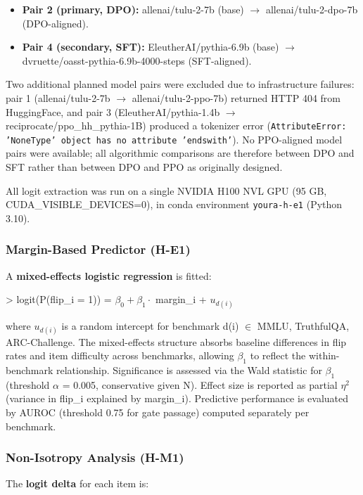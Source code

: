 \begin{itemize}
\item \textbf{Pair 2 (primary, DPO):} allenai/tulu-2-7b (base) $\rightarrow$ allenai/tulu-2-dpo-7b (DPO-aligned).
\item \textbf{Pair 4 (secondary, SFT):} EleutherAI/pythia-6.9b (base) $\rightarrow$ dvruette/oasst-pythia-6.9b-4000-steps (SFT-aligned).
\end{itemize}

Two additional planned model pairs were excluded due to infrastructure failures: pair 1 (allenai/tulu-2-7b $\rightarrow$ allenai/tulu-2-ppo-7b) returned HTTP 404 from HuggingFace, and pair 3 (EleutherAI/pythia-1.4b $\rightarrow$ reciprocate/ppo\_hh\_pythia-1B) produced a tokenizer error (\texttt{AttributeError: 'NoneType' object has no attribute 'endswith'}). No PPO-aligned model pairs were available; all algorithmic comparisons are therefore between DPO and SFT rather than between DPO and PPO as originally designed.

All logit extraction was run on a single NVIDIA H100 NVL GPU (95 GB, CUDA\_VISIBLE\_DEVICES=0), in conda environment \texttt{youra-h-e1} (Python 3.10).

\subsubsection{Margin-Based Predictor (H-E1)}

A \textbf{mixed-effects logistic regression} is fitted:

> logit(P(flip\_i = 1)) = $\beta _0 + \beta _1 \cdot$ margin\_i + $u_{d(i)}$

where $u_{d(i)}$ is a random intercept for benchmark d(i) $\in$ {MMLU, TruthfulQA, ARC-Challenge}. The mixed-effects structure absorbs baseline differences in flip rates and item difficulty across benchmarks, allowing $\beta _1$ to reflect the within-benchmark relationship. Significance is assessed via the Wald statistic for $\beta _1$ (threshold $\alpha$ = 0.005, conservative given N). Effect size is reported as partial $\eta^2$ (variance in flip\_i explained by margin\_i). Predictive performance is evaluated by AUROC (threshold 0.75 for gate passage) computed separately per benchmark.

\subsubsection{Non-Isotropy Analysis (H-M1)}

The \textbf{logit delta} for each item is:

